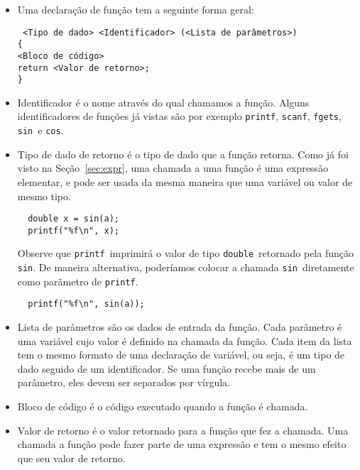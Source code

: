 \documentclass{book}
\newcommand{\TAB}{{\hspace*{1cm}}}
\newcommand{\DOUBLE}{{\tt double}}
\newcommand{\SIN}{{\tt sin}}
\newcommand{\COS}{{\tt cos}}
\newcommand{\PRINTF}{{\tt printf}}
\newcommand{\SCANF}{{\tt scanf}}
\newcommand{\FGETS}{{\tt fgets}}
\begin{document}
\begin{itemize}

\item Uma declaração de função tem a seguinte forma geral:

{\tt
<Tipo de dado> <Identificador> (<Lista de parâmetros>)\\
\{\\
\TAB <Bloco de código>\\
\TAB return <Valor de retorno>;\\
\}\\
}

\item Identificador é o nome através do qual chamamos a função. Alguns identificadores de funções já vistas são por exemplo \PRINTF, \SCANF, \FGETS, \SIN\ e \COS.

\item Tipo de dado de retorno é o tipo de dado que a função retorna. Como já foi visto na Seção~\ref{sec:expr}, uma chamada a uma função é uma expressão elementar, e pode ser usada da mesma maneira que uma variável ou valor de mesmo tipo.

\begin{lstlisting}
  double x = sin(a);
  printf("%f\n", x);
\end{lstlisting}

  Observe que \PRINTF\ imprimirá o valor de tipo \DOUBLE\ retornado pela função \SIN. De maneira alternativa, poderíamos colocar a chamada \SIN\ diretamente como parãmetro de \PRINTF.

\begin{lstlisting}
  printf("%f\n", sin(a));
\end{lstlisting}

\item Lista de parâmetros são os dados de entrada da função. Cada parâmetro é uma variável cujo valor é definido na chamada da função. Cada item da lista tem o mesmo formato de uma declaração de variável, ou seja, é um tipo de dado seguido de um identificador. Se uma função recebe mais de um parâmetro, eles devem ser separados por vírgula.

\item Bloco de código é o código executado quando a função é chamada.

\item Valor de retorno é o valor retornado para a função que fez a chamada. Uma chamada a função pode fazer parte de uma expressão e tem o mesmo efeito que seu valor de retorno.

\end{itemize}
\end{document}
